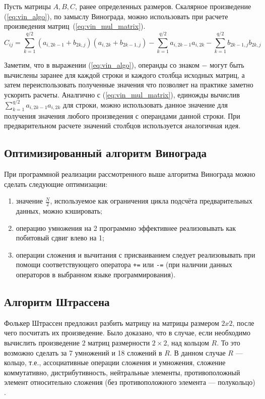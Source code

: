 Пусть матрицы $A, B, C$, ранее определенных размеров. Скалярное произведение (\ref{eq:vin_algo}), по замыслу Винограда, можно использовать при расчете 
произведения матриц~(\ref{eq:vin_mul_matrix}).
\begin{equation} 
	\label{eq:vin_mul_matrix}
	C_{ij} = \sum_{k=1}^{q/2}(a_{i,2k-1} + b_{2k,j})(a_{i,2k} + b_{2k-1,j}) - \sum_{k=1}^{q/2} a_{i,2k-1}a_{i,2k} - \sum_{k=1}^{q/2} b_{2k-1,j}b_{2k,j}
\end{equation}


Заметим, что в выражении (\ref{eq:vin_algo}), операнды со знаком $-$ могут быть вычислены заранее для каждой
строки и каждого столбца исходных матриц, а затем переиспользовать полученные значения что позволяет на практике заметно ускорить расчеты.
Аналгично с (\ref{eq:vin_mul_matrix}), единожды вычислив $\sum_{k=1}^{q/2}a_{i,2k-1}a_{i,2k}$ для строки, можно использовать данное
значение для получения значения любого произведения с операндами данной строки. При  предварительном расчете 
значений столбцов используется аналогичная идея.



\subsection{Оптимизированный алгоритм Винограда}

При программной реализации рассмотренного выше алгоритма Винограда можно сделать следующие оптимизации:
\begin{enumerate}
	\item значение $\frac{N}{2}$, используемое как ограничения цикла подсчёта предварительных данных, можно кэшировать;
	\item операцию умножения на 2 программно эффективнее реализовывать как побитовый сдвиг влево на 1;
	\item операции сложения и вычитания с присваиванием следует реализовывать при помощи соответствующего оператора \texttt{+=} или \texttt{-=} (при наличии данных операторов в выбранном языке программирования).
\end{enumerate}

\subsection{Алгоритм Штрассена}
Фолькер Штрассен предложил разбить матрицу на матрицы размером $2x2$, после чего посчитать их произведение. Было доказано, что в случае, если необходимо вычислить
произведение 2 матриц размерности $2\times2$, над кольцом $R$. То это возможно сделать за 7 умножений и 18 сложений в $R$. В данном случае $R$ — кольцо, т.е., ассоциативные операции сложения и умножения, сложение коммутативно, дистрибутивность, нейтральные элементы, противоположный элемент относительно
сложения (без противоположного элемента — полукольцо) \cite{strassen}.

